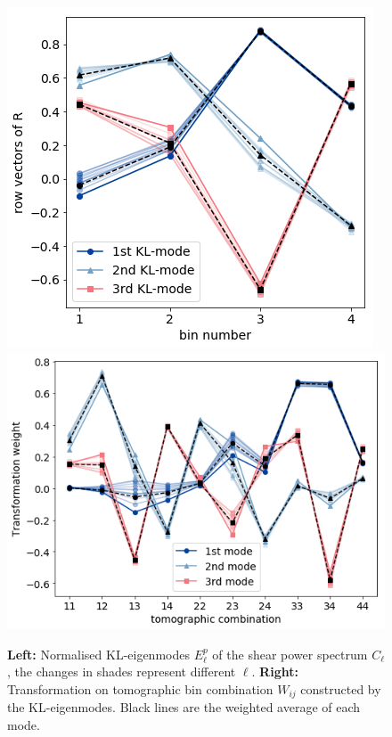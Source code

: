 \documentclass[twocolumn]{\docclass}
\begin{document}
	\begin{figure}
		\includegraphics[width=0.80\columnwidth]{epi.png}
		\includegraphics[width=1.02\columnwidth]{Wij.png}
		\caption{\textbf{Left:} Normalised KL-eigenmodes $E_\ell^p$ of the shear power spectrum $C_{\ell}$, the changes in shades represent different $\ell$. \textbf{Right:} Transformation on tomographic bin combination $W_{ij}$ constructed by the KL-eigenmodes. Black lines are the weighted average of each mode. \label{fig:kl-mode}}
	\end{figure}
	
\end{document}
